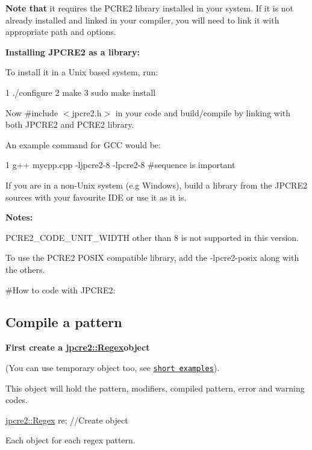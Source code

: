 {\bfseries Note that} it requires the P\+C\+R\+E2 library installed in your system. If it is not already installed and linked in your compiler, you will need to link it with appropriate path and options.

{\bfseries Installing J\+P\+C\+R\+E2 as a library\+:}

To install it in a Unix based system, run\+: 
\begin{DoxyCode}
1 ./configure
2 make
3 sudo make install
\end{DoxyCode}
 Now {\ttfamily \#include $<$jpcre2.\+h$>$} in your code and build/compile by linking with both J\+P\+C\+R\+E2 and P\+C\+R\+E2 library.

An example command for G\+CC would be\+:


\begin{DoxyCode}
1 g++  mycpp.cpp -ljpcre2-8 -lpcre2-8 #sequence is important
\end{DoxyCode}


If you are in a non-\/\+Unix system (e.\+g Windows), build a library from the J\+P\+C\+R\+E2 sources with your favourite I\+DE or use it as it is.

{\bfseries Notes\+:}


\begin{DoxyEnumerate}
\item {\ttfamily P\+C\+R\+E2\+\_\+\+C\+O\+D\+E\+\_\+\+U\+N\+I\+T\+\_\+\+W\+I\+D\+TH} other than 8 is not supported in this version.
\item To use the {\ttfamily P\+C\+R\+E2 P\+O\+S\+IX} compatible library, add the {\ttfamily -\/lpcre2-\/posix} along with the others.
\end{DoxyEnumerate}

\#\+How to code with J\+P\+C\+R\+E2\+:

 \subsection*{Compile a pattern}

{\bfseries First create a {\ttfamily \hyperlink{classjpcre2_1_1Regex}{jpcre2\+::\+Regex}}object}

(You can use temporary object too, see \href{#short-examples}{\tt short examples}).

This object will hold the pattern, modifiers, compiled pattern, error and warning codes.


\begin{DoxyCode}
\hyperlink{classjpcre2_1_1Regex}{jpcre2::Regex} re;   \textcolor{comment}{//Create object}
\end{DoxyCode}
 Each object for each regex pattern.

